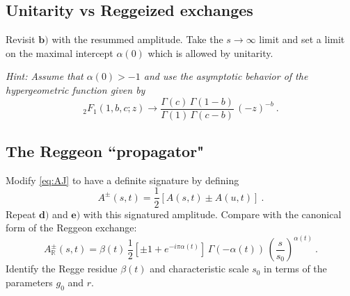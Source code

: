 \subsection{Unitarity vs Reggeized exchanges}
Revisit $\mathbf{b)}$ with the resummed amplitude. Take the $s\to\infty$ limit and set a limit on the maximal intercept $\alpha(0)$ which is allowed by unitarity.  

\noindent \textit{Hint: Assume that $\alpha(0) > -1$ and use the asymptotic behavior of the hypergeometric function given by 
    \begin{equation}
        _2F_1(1,b,c;z) \to \frac{\Gamma(c)\,\Gamma(1-b)}{\Gamma(1) \,\Gamma(c-b)} \, (-z)^{-b}  ~.
    \end{equation}
}

\subsection{The Reggeon ``propagator"}
Modify \cref{eq:AJ} to have a definite signature by defining
    \begin{equation}
        A^{\pm}(s,t) = \frac{1}{2}\left[A(s,t) \pm A(u,t) \right]~.
    \end{equation}
Repeat $\textbf{d)}$ and  $\textbf{e)}$ with this signatured amplitude. Compare with the canonical form of the Reggeon exchange:
    \begin{equation}
        A^\pm_\mathbb{R}(s,t) = \beta(t) \, \frac{1}{2}\left[\pm1 + e^{-i\pi\alpha(t)}\right] \, \Gamma(-\alpha(t)) \, \left(\frac{s}{s_0}\right)^{\alpha(t)} ~.
    \end{equation}
Identify the Regge residue $\beta(t)$ and characteristic scale $s_0$ in terms of the parameters $g_0$ and $r$. 
